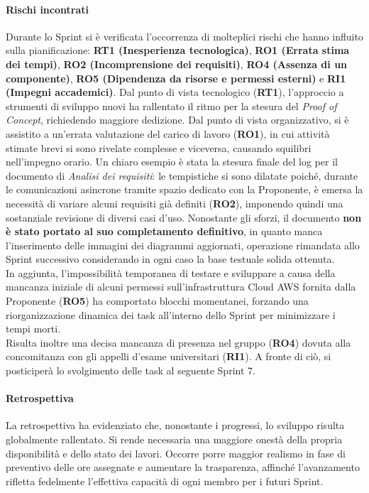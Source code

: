 \documentclass[a4paper,12pt]{article}
\begin{document}
\paragraph{Rischi incontrati}
{\sloppy
Durante lo Sprint si è verificata l'occorrenza di molteplici rischi che hanno influito sulla pianificazione: \textbf{RT1 (Inesperienza tecnologica)}, \textbf{RO1 (Errata stima dei tempi)}, \textbf{RO2 (Incomprensione dei requisiti)}, \textbf{RO4 (Assenza di un componente)}, \textbf{RO5 (Dipendenza da risorse e permessi esterni)} e \textbf{RI1 (Impegni accademici)}. Dal punto di vista tecnologico (\textbf{RT1}), l'approccio a strumenti di sviluppo nuovi ha rallentato il ritmo per la stesura del \textit{Proof of Concept}, richiedendo maggiore dedizione. Dal punto di vista organizzativo, si è assistito a un'errata valutazione del carico di lavoro (\textbf{RO1}), in cui attività stimate brevi si sono rivelate complesse e viceversa, causando squilibri nell'impegno orario. Un chiaro esempio è stata la stesura finale del log per il documento di \textit{Analisi dei requisiti}: le tempistiche si sono dilatate poiché, durante le comunicazioni asincrone tramite spazio dedicato con la Proponente, è emersa la necessità di variare alcuni requisiti già definiti (\textbf{RO2}), imponendo quindi una sostanziale revisione di diversi casi d'uso. Nonostante gli sforzi, il documento \textbf{non è stato portato al suo completamento definitivo}, in quanto manca l'inserimento delle immagini dei diagrammi aggiornati, operazione rimandata allo Sprint successivo considerando in ogni caso la base testuale solida ottenuta.\\
In aggiunta, l'impossibilità temporanea di testare e sviluppare a causa della mancanza iniziale di alcuni permessi sull'infrastruttura Cloud AWS fornita dalla Proponente (\textbf{RO5}) ha comportato blocchi momentanei, forzando una riorganizzazione dinamica dei task all'interno dello Sprint per minimizzare i tempi morti.\\
Risulta inoltre una decisa mancanza di presenza nel gruppo (\textbf{RO4}) dovuta alla concomitanza con gli appelli d'esame universitari (\textbf{RI1}). A fronte di ciò, si posticiperà lo svolgimento delle task al seguente Sprint 7.
\par}

\paragraph{Retrospettiva}
La retrospettiva ha evidenziato che, nonostante i progressi, lo sviluppo risulta globalmente rallentato. Si rende necessaria una maggiore onestà della propria disponibilità e dello stato dei lavori. Occorre porre maggior realismo in fase di preventivo delle ore assegnate e aumentare la trasparenza, affinché l'avanzamento rifletta fedelmente l'effettiva capacità di ogni membro per i futuri Sprint.
\end{document}
